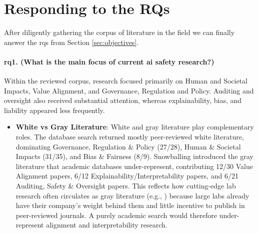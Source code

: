 

    \section{Responding to the RQs}\label{sec:rq_response}

    After diligently gathering the corpus of literature in the field we can finally answer the \glspl{rq} from Section \ref{sec:objectives}.


    \paragraph{\gls{rq}1. (\textbf{What is the main focus of current \gls{ai} safety research?)}} Within the reviewed corpus, research focused primarily on Human and Societal Impacts, Value Alignment, and Governance, Regulation and Policy. Auditing and oversight also received substantial attention, whereas explainability, bias, and liability appeared less frequently.
    \begin{itemize}
        \item \textbf{White vs Gray Literature}: White and gray literature play complementary roles. The database search returned mostly peer-reviewed white literature, dominating Governance, Regulation \& Policy (27/28), Human \& Societal Impacts (31/35), and Bias \& Fairness (8/9). Snowballing introduced the gray literature that academic databases under-represent, contributing 12/30 Value Alignment papers, 6/12 Explainability/Interpretability papers, and 6/21 Auditing, Safety \& Oversight papers. This reflects how cutting-edge lab research often circulates as gray literature (e.g., \cite{greenblatt_alignment_faking, openai2026astra}) because large labs already have their company's weight behind them and little incentive to publish in peer-reviewed journals. A purely academic search would therefore under-represent alignment and interpretability research.

    \end{itemize}

